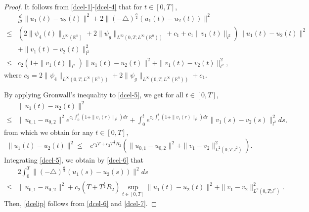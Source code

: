 \documentclass[11pt]{article}
\numberwithin{equation}{section}
\theoremstyle{plain}
\def\leq{\leqslant}
\begin{document}
\begin{proof}
 It  follows from \eqref{dcel-1}-\eqref{dcel-4} that for $t \in [0,T]$,
\begin{align} \label{dcel-5}
        & \frac{d}{dt} \| u_1(t) - u_2(t) \|^2
          + 2 \| (-\triangle)^{\frac{\alpha}{2}} \left( u_1(t) - u_2(t) \right) \|^2
             \nonumber \\
   \leq & \left( 2 \| \psi_4(t) \|_{L^\infty(\mathbb{R}^n)}
                    + 2 \|\psi_g\|_{L^\infty(0,T;L^\infty(\mathbb{R}^n) ) }
                    + c_1
                    + c_1 \| v_1(t) \|_{l^2}
            \right)
            \| u_1(t) - u_2(t) \|^2
                \nonumber \\
        & + \| v_1(t) - v_2(t) \|_{l^2}^2
                \nonumber \\
   \leq & c_2 \left( 1 + \| v_1(t) \|_{l^2}
              \right)  \| u_1(t) - u_2(t) \|^2
          + \| v_1(t) - v_2(t) \|_{l^2}^2,
\end{align}
 where
      $ c_2 = 2 \| \psi_4 \|_{L^\infty(0,T; L^\infty(\mathbb{R}^n) ) }
              + 2 \|\psi_g\|_{L^\infty(0,T;L^\infty(\mathbb{R}^n) ) }
              + c_1.
      $

 By  applying Gronwall's inequality to \eqref{dcel-5}, we
 get for all  $t \in [0,T]$,
\begin{align*}
       & \| u_1(t) - u_2(t) \|^2
             \nonumber \\
  \leq & \| u_{0,1} - u_{0,2} \|^2
         e^{ c_2 \int_{0}^{t}
                          \left( 1 + \| v_1(r) \|_{l^2}
                           \right) dr }
        + \int_{0}^{t}
                       e^{ c_2 \int_{s}^{t}
                                  \left( 1 + \| v_1(r) \|_{l^2}
                                 \right) dr }
                       \| v_1(s) - v_2(s) \|_{l^2}^2 ds,
\end{align*}
 from which we obtain for any $t \in [0,T]$,
\begin{align} \label{dcel-6}
           \| u_1(t) - u_2(t) \|^2
    \leq & e^{ c_2 T + c_2 T^{\frac{1}{2}} R_2 }
           \left( \| u_{0,1} - u_{0,2} \|^2
                   + \| v_1 - v_2 \|_{L^2(0,T; l^2)}^2
           \right).
\end{align}
 Integrating \eqref{dcel-5}, we obtain by \eqref{dcel-6}  that
\begin{align} \label{dcel-7}
        &  2\int_0^T
                   \| (-\triangle)^{\frac{\alpha}{2}} \left( u_1(s) - u_2(s) \right)
                   \|^2 ds  \nonumber \\
   \leq &
    \| u_{0,1} - u_{0,2} \|^2
    +
   c_2
             \left( T + T^{\frac{1}{2}} R_2
             \right)
          \sup_{t\in [0,T]} \| u_1(t) - u_2(t) \|^2
          + \| v_1 - v_2 \|_{L^2(0,T; l^2)}^2.
\end{align}
Then, \eqref{dcelip} follows from \eqref{dcel-6} and \eqref{dcel-7}.
\end{proof}
\end{document}
